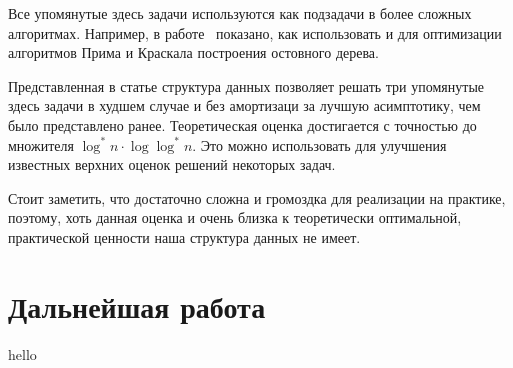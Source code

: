 Все упомянутые здесь задачи используются как подзадачи в более
сложных алгоритмах. Например, в работе~\cite{quick-heap} показано,
как использовать \IncSort и \PriQ для оптимизации алгоритмов
Прима и Краскала построения остовного дерева.

Представленная в статье структура данных \CH позволяет
решать три упомянутые здесь задачи в худшем случае и без амортизаци
за лучшую асимптотику, чем было представлено ранее. Теоретическая
оценка достигается с точностью до множителя $\log^*n \cdot \log \log^*n$.
Это можно использовать для улучшения известных верхних оценок
решений некоторых задач.

Стоит заметить, что \CH достаточно сложна и громоздка для реализации
на практике, поэтому, хоть данная оценка и очень близка к теоретически
оптимальной, практической ценности наша структура данных не имеет.

\section{Дальнейшая работа}
hello
